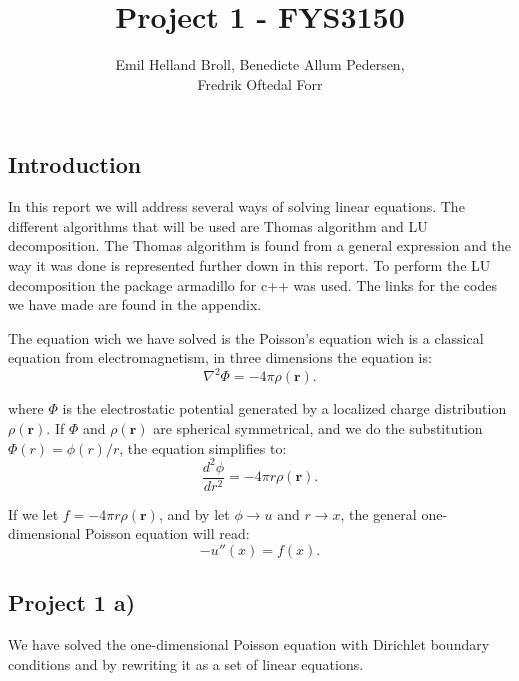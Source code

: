 \documentclass{article}
\title{Project 1 - FYS3150}\vspace{-3ex}
\author{Emil Helland Broll, Benedicte Allum Pedersen,\\ Fredrik Oftedal Forr}
\date{\vspace{-5ex}}
\begin{document}
\maketitle

\subsection*{Introduction}
In this report we will address several ways of solving linear equations. The different algorithms that will be used are Thomas algorithm and LU decomposition. The Thomas algorithm is found from a general expression and the way it was done is represented further down in this report. To perform the LU decomposition the package armadillo for c++ was used. The links for the codes we have made are found in the appendix.

\vspace{0.3cm}

The equation wich we have solved is the Poisson's equation wich is a classical equation from electromagnetism, in three dimensions the equation is:
\begin{equation*}
\nabla^2 \Phi = -4\pi \rho (\mathbf{r}).
\end{equation*}

where $\Phi$ is the electrostatic potential generated by a localized charge distribution $\rho (\mathbf{r})$. If $\Phi$ and $\rho (\mathbf{r})$ are spherical symmetrical, and we do the substitution $\Phi(r)= \phi(r)/r$, the equation simplifies to:
\begin{equation*}
\frac{d^2\phi}{dr^2}= -4\pi r\rho(\mathbf{r}).
\end{equation*}

If we let $f = -4\pi r \rho (\mathbf{r})$, and by let $\phi\rightarrow u$ and
$r\rightarrow x$, the general one-dimensional Poisson equation will read:
\begin{equation*}
-u''(x) = f(x).
\end{equation*}

\subsection*{Project 1 a)}

\noindent We have solved the one-dimensional Poisson equation with Dirichlet boundary conditions and by rewriting it as a set of linear equations.
\end{document}
